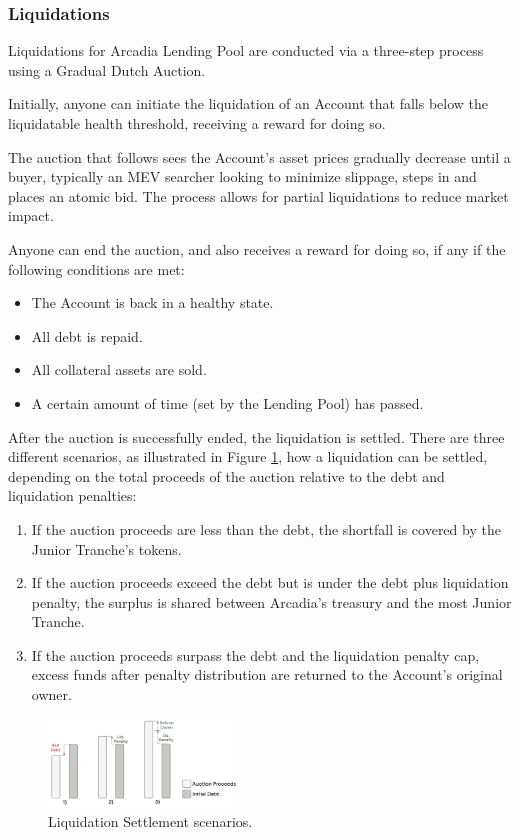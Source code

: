 \documentclass[sigconf,nonacm]{acmart}
\begin{document}
\subsubsection{Liquidations}
\label{subsubsec:liquidations}
Liquidations for Arcadia Lending Pool are conducted via a three-step process using a Gradual Dutch Auction.

Initially, anyone can initiate the liquidation of an Account that falls below the liquidatable health threshold,
receiving a reward for doing so.

The auction that follows sees the Account's asset prices gradually decrease until a buyer,
typically an MEV searcher looking to minimize slippage, steps in and places an atomic bid.
The process allows for partial liquidations to reduce market impact.

Anyone can end the auction, and also receives a reward for doing so, if any if the following conditions are met:
\begin{itemize}
    \item The Account is back in a healthy state.
    \item All debt is repaid.
    \item All collateral assets are sold.
    \item A certain amount of time (set by the Lending Pool) has passed.
\end{itemize}

After the auction is successfully ended, the liquidation is settled.
There are three different scenarios, as illustrated in Figure \ref{fig:liquidation-settlement}, how a liquidation can be settled,
depending on the total proceeds of the auction relative to the debt and liquidation penalties:
\begin{enumerate}
    \item If the auction proceeds are less than the debt,
    the shortfall is covered by the Junior Tranche's tokens.
    \item If the auction proceeds exceed the debt but is under the debt plus liquidation penalty,
    the surplus is shared between Arcadia's treasury and the most Junior Tranche.
    \item If the auction proceeds surpass the debt and the liquidation penalty cap,
    excess funds after penalty distribution are returned to the Account's original owner.
\end{enumerate}

\begin{figure}
    \centering
    \includegraphics[width=0.45\textwidth]{images/Liquidation-Settlement.png}
    \caption{Liquidation Settlement scenarios. \label{fig:liquidation-settlement}}
\end{figure}
\end{document}
